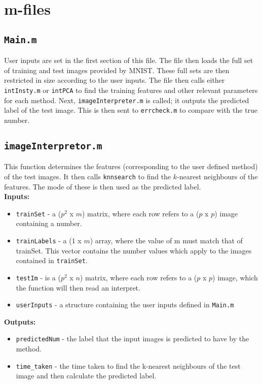 \documentclass[10pt]{article}
\begin{document}
\section{m-files} 

\subsection{\tt Main.m} 
User inputs are set in the first section of this file. The file then loads the full set of training and test images provided by MNIST. These full sets are then restricted in size according to the user inputs. The file then calls either {\tt intInsty.m} or {\tt intPCA} to find the training features and other relevant parameters for each method. Next, {\tt imageInterpreter.m} is called; it outputs the predicted label of the test image. This is then sent to {\tt errcheck.m} to compare with the true number.  


\subsection{\tt imageInterpretor.m} 
This function determines the features (corresponding to the user defined method) of the test images. It then calls {\tt knnsearch} to find the $k$-nearest neighbours of the features. The mode of these is then used as the predicted label. \\ 

{\bf Inputs:} 
\begin{itemize} 
\item {\tt trainSet} - a ($p^2$ x $m$) matrix, where each row refers to a ($p$ x $p$) image containing a number.
\item {\tt trainLabels} - a ($1$ x $m$) array, where the value of m must match that of trainSet. This vector contains the number values which apply to the images contained in {\tt trainSet}.
\item {\tt testIm} - is a ($p^2$ x $n$) matrix, where each row refers to a ($p$ x $p$) image, which the function will then read an interpret.
\item {\tt userInputs} - a structure containing the user inputs defined in {\tt Main.m} 
\end{itemize} 

{\bf Outputs:} 
\begin{itemize} 
\item {\tt predictedNum} - the label that the input images is predicted to have by the method. 
\item {\tt time\_taken} - the time taken to find the k-nearest neighbours of the test image and then calculate the predicted label. 
\end{itemize}
\end{document}
